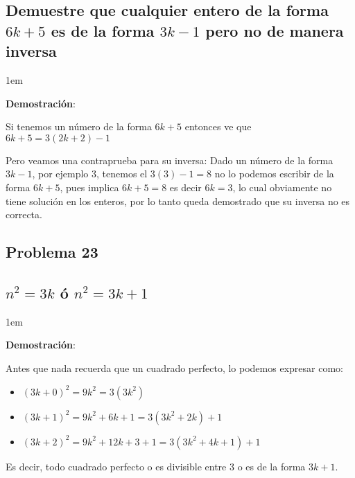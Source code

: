 \documentclass[12pt, fleqn]{article}                             %
\newenvironment{SmallIndentation}[1][0.75em]                    %
    {\begin{adjustwidth}{#1}{}\begin{footnotesize}}                 %
    {\end{footnotesize}\end{adjustwidth}}                           %
\begin{document}
    \subsection*{Demuestre que cualquier entero de la forma $6k+5$ es de la forma $3k-1$
        pero no de manera inversa}


        \begin{SmallIndentation}[1em]
            \textbf{Demostración}:

            Si tenemos un número de la forma $6k+5$ entonces ve que $6k+5 = 3(2k+2)-1$

            Pero veamos una contraprueba para su inversa:
            Dado un número de la forma $3k-1$, por ejemplo 3, tenemos el $3(3)-1=8$ no lo
            podemos escribir de la forma $6k+5$, pues implica $6k+5=8$ es decir
            $6k=3$, lo cual obviamente no tiene solución en los enteros, por lo tanto
            queda demostrado que su inversa no es correcta.
            
        \end{SmallIndentation}



    \subsection{Problema 23}
    \subsection*{$n^2 = 3k$ ó $n^2 = 3k + 1$}


        \begin{SmallIndentation}[1em]
            \textbf{Demostración}:

            Antes que nada recuerda que un cuadrado perfecto, lo podemos expresar como:
            \begin{itemize}
                \item $(3k+0)^2 = 9k^2 = 3(3k^2)$
                \item $(3k+1)^2 = 9k^2 + 6k + 1 = 3(3k^2 + 2k) + 1$
                \item $(3k+2)^2 = 9k^2 + 12k + 3 +1 = 3(3k^2 + 4k + 1) + 1$
            \end{itemize}

            Es decir, todo cuadrado perfecto o es divisible entre 3 o es de la forma
            $3k+1$.
            
        \end{SmallIndentation}
\end{document}
